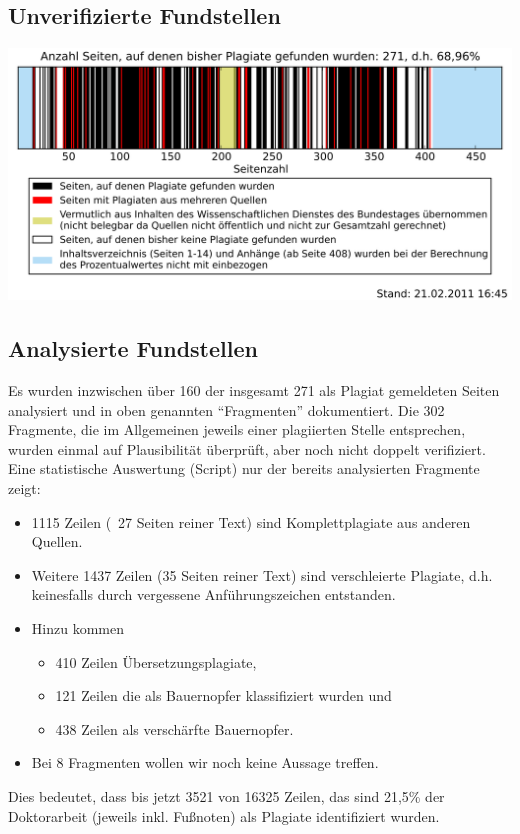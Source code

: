 \documentclass[ngerman,final,fontsize=12pt,paper=a4,twoside,BCOR=8mm,draft=false]{scrartcl}
\begin{document}
\subsection{Unverifizierte Fundstellen}

\includegraphics[scale=0.6]{Barcode-Zwischenbericht}

\subsection{Analysierte Fundstellen}

Es wurden inzwischen über 160 der insgesamt 271 als Plagiat gemeldeten Seiten analysiert und in oben genannten "`Fragmenten"' dokumentiert. Die 302 Fragmente, die im Allgemeinen jeweils einer plagiierten Stelle entsprechen, wurden einmal auf Plausibilität überprüft, aber noch nicht doppelt verifiziert.
Eine statistische Auswertung (Script) nur der bereits analysierten Fragmente zeigt:

\begin{itemize}
\item 1115 Zeilen (~27 Seiten reiner Text) sind Komplettplagiate aus anderen Quellen.
\item Weitere 1437 Zeilen (35 Seiten reiner Text) sind verschleierte Plagiate, d.h. keinesfalls durch vergessene Anführungszeichen entstanden.
\item Hinzu kommen \begin{itemize}
      \item 410 Zeilen Übersetzungsplagiate,
      \item 121 Zeilen die als Bauernopfer klassifiziert wurden und
      \item 438 Zeilen als verschärfte Bauernopfer. \end{itemize}
\item Bei 8 Fragmenten wollen wir noch keine Aussage treffen.
\end{itemize}
Dies bedeutet, dass bis jetzt 3521 von 16325 Zeilen, das sind 21,5\% der Doktorarbeit (jeweils inkl. Fußnoten) als Plagiate identifiziert wurden.
\end{document}

